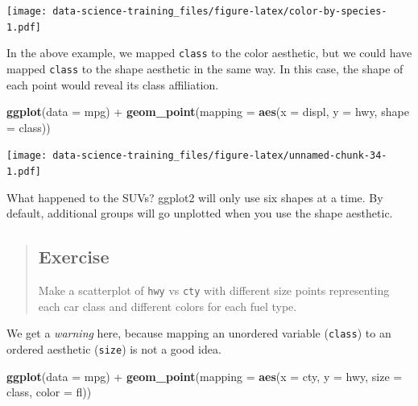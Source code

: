 \documentclass[]{book}
\newenvironment{Shaded}{\begin{snugshade}}{\end{snugshade}}
\newcommand{\KeywordTok}[1]{\textcolor[rgb]{0.13,0.29,0.53}{\textbf{{#1}}}}
\newcommand{\DataTypeTok}[1]{\textcolor[rgb]{0.13,0.29,0.53}{{#1}}}
\newcommand{\StringTok}[1]{\textcolor[rgb]{0.31,0.60,0.02}{{#1}}}
\newcommand{\NormalTok}[1]{{#1}}
\theoremstyle{definition}
\theoremstyle{definition}
\theoremstyle{definition}
\theoremstyle{remark}
\begin{document}
\texttt{[image: data-science-training\_files/figure-latex/color-by-species-1.pdf]}

In the above example, we mapped \texttt{class} to the color aesthetic,
but we could have mapped \texttt{class} to the shape aesthetic in the
same way. In this case, the shape of each point would reveal its class
affiliation.

\begin{Shaded}
\begin{Highlighting}[]
\KeywordTok{ggplot}\NormalTok{(}\DataTypeTok{data =} \NormalTok{mpg) +}\StringTok{ }
\StringTok{  }\KeywordTok{geom_point}\NormalTok{(}\DataTypeTok{mapping =} \KeywordTok{aes}\NormalTok{(}\DataTypeTok{x =} \NormalTok{displ, }\DataTypeTok{y =} \NormalTok{hwy, }\DataTypeTok{shape =} \NormalTok{class))}
\end{Highlighting}
\end{Shaded}

\texttt{[image: data-science-training\_files/figure-latex/unnamed-chunk-34-1.pdf]}

What happened to the SUVs? ggplot2 will only use six shapes at a time.
By default, additional groups will go unplotted when you use the shape
aesthetic.

\begin{quote}
\subsection{Exercise}\label{exercise}

Make a scatterplot of \texttt{hwy} vs \texttt{cty} with different size
points representing each car class and different colors for each fuel
type.
\end{quote}

We get a \emph{warning} here, because mapping an unordered variable
(\texttt{class}) to an ordered aesthetic (\texttt{size}) is not a good
idea.

\begin{Shaded}
\begin{Highlighting}[]
\KeywordTok{ggplot}\NormalTok{(}\DataTypeTok{data =} \NormalTok{mpg) +}\StringTok{ }
\StringTok{  }\KeywordTok{geom_point}\NormalTok{(}\DataTypeTok{mapping =} \KeywordTok{aes}\NormalTok{(}\DataTypeTok{x =} \NormalTok{cty, }\DataTypeTok{y =} \NormalTok{hwy, }\DataTypeTok{size =} \NormalTok{class, }\DataTypeTok{color =} \NormalTok{fl))}
\end{Highlighting}
\end{Shaded}
\end{document}
